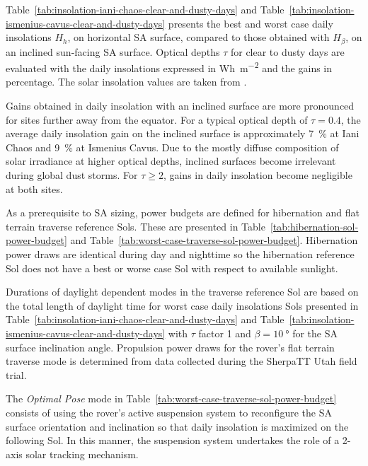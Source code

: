 \documentclass[twocolumn,letterpaper]{IEEEAerospaceCLS}  %
\newcommand{\refTab}[1]{{Table}~\ref{#1}}  %
\begin{document}


\refTab{tab:insolation-iani-chaos-clear-and-dusty-days} and \refTab{tab:insolation-ismenius-cavus-clear-and-dusty-days} presents the best and worst case daily insolations $H_{h}$, on horizontal \ac{SA} surface, compared to those obtained with $H_{\beta}$, on an inclined sun-facing \ac{SA} surface. Optical depths $\tau$ for clear to dusty days are evaluated with the daily insolations expressed in \si{Wh.m^{-2}} and the gains in percentage. The solar insolation values are taken from \cite{Labreche2020}.



Gains obtained in daily insolation with an inclined surface are more pronounced for sites further away from the equator. For a typical optical depth of $\tau = 0.4$, the average daily insolation gain on the inclined surface is approximately \SI{7}{\percent} at Iani Chaos and \SI{9}{\percent} at Ismenius Cavus.
Due to the mostly diffuse composition of solar irradiance at higher optical depths, inclined surfaces become irrelevant during global dust storms. For $\tau \geq 2$, gains in daily insolation become negligible at both sites.

As a prerequisite to \ac{SA} sizing, power budgets are defined for hibernation and flat terrain traverse reference Sols. These are presented in \refTab{tab:hibernation-sol-power-budget} and \refTab{tab:worst-case-traverse-sol-power-budget}. Hibernation power draws are identical during day and nighttime so the hibernation reference Sol does not have a best or worse case Sol with respect to available sunlight.



Durations of daylight dependent modes in the traverse reference Sol are based on the total length of daylight time for worst case daily insolations Sols presented in \refTab{tab:insolation-iani-chaos-clear-and-dusty-days} and \refTab{tab:insolation-ismenius-cavus-clear-and-dusty-days} with $\tau$ factor 1 and $\beta=\SI{10}{\degree}$ for the \ac{SA} surface inclination angle. Propulsion power draws for the rover's flat terrain traverse mode is determined from data collected during the SherpaTT Utah field trial.



The \textit{Optimal Pose} mode in \refTab{tab:worst-case-traverse-sol-power-budget} consists of using the rover's active suspension system to reconfigure the \ac{SA} surface orientation and inclination so that daily insolation is maximized on the following Sol. In this manner, the suspension system undertakes the role of a 2-axis solar tracking mechanism.
\end{document}
